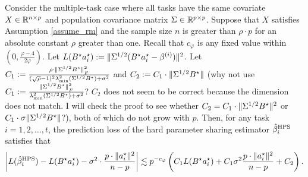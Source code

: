 \begin{theorem}\label{thm_many_tasks}
	Consider the multiple-task case where all tasks have the same covariate $X\in\mathbb{R}^{n\times p}$ and population covariance matrix $\Sigma\in\mathbb{R}^{p\times p}$.
	Suppose that $X$ satisfies Assumption \ref{assume_rm} and the sample size $n$ is greater than $\rho \cdot p$ for an absolute constant $\rho$ greater than one.
	Recall that $c_{\varphi}$ is any fixed value within $(0, \frac{\varphi-4}{2\varphi})$.
	Let $L(B^{\star}a_i^{\star}): = \|\Sigma^{1/2} (B^{\star} a_i^{\star}- \beta^{(i)})\|^2$.
	Let $C_1: = \frac{\rho\cdot \|\Sigma^{1/2} B^{\star}\|_{_{F}}^2}{(\sqrt{\rho} - 1)^2\lambda_{\min}^2(\Sigma^{1/2} B^{\star}) + \sigma^2}$ and $C_2 :=  C_1\cdot \|\Sigma^{1/2} B^{\star}\|$ ({\cor why not use $C_1: = \frac{ \|\Sigma^{1/2} B^{\star}\|_{_{F}}^2}{ \lambda_{\min}^2(\Sigma^{1/2} B^{\star}) + \sigma^2}$? $C_2$ does not seem to be correct because the dimension does not match. I will check the proof to see whether $C_2 =  C_1\cdot \|\Sigma^{1/2} B^{\star}\|^2$ or $C_1\cdot \sigma\|\Sigma^{1/2} B^{\star}\|$?}), both of which do not grow with $p$.
	Then, for any task $i = 1, 2, \dots, t$, the prediction loss of the hard parameter sharing estimator $\hat{\beta}_i^{\textup{HPS}}$ satisfies that
	\begin{align}
		{\left| {L(\hat{\beta}_i^{\textup{HPS}}) - L(B^{\star}a_i^{\star}) - \sigma^2  \cdot \frac{p \cdot \|a_i^{\star}\|^2}{n - p}} \right|} \lesssim p^{-c_{\varphi}}\left({C_1 L(B^{\star}a_i^{\star}) + C_1 \sigma^2 \frac{p \cdot{\|a_i^{\star}\|^2}}{n-p} + C_2}\right). \label{eq_thm_many}
	\end{align}

\end{theorem}
